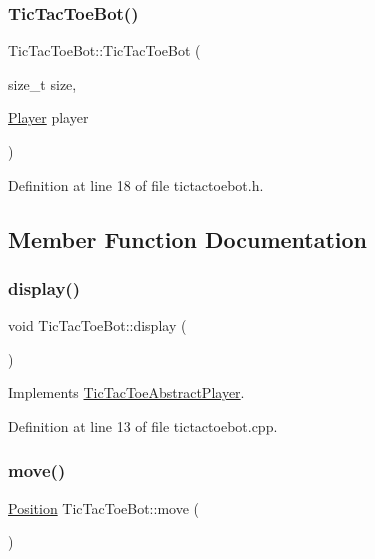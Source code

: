 \subsubsection{\texorpdfstring{Tic\+Tac\+Toe\+Bot()}{TicTacToeBot()}}
{\footnotesize\ttfamily Tic\+Tac\+Toe\+Bot\+::\+Tic\+Tac\+Toe\+Bot (\begin{DoxyParamCaption}\item[{size\+\_\+t}]{size,  }\item[{\hyperlink{common__defs_8h_a9c8780378078e51e7c9041cbac392db9}{Player}}]{player }\end{DoxyParamCaption})\hspace{0.3cm}{\ttfamily [inline]}}



Definition at line 18 of file tictactoebot.\+h.



\subsection{Member Function Documentation}
\mbox{\label{class_tic_tac_toe_bot_a2af7f24506849f05ed37e9750b515c3d}} 
\subsubsection{\texorpdfstring{display()}{display()}}
{\footnotesize\ttfamily void Tic\+Tac\+Toe\+Bot\+::display (\begin{DoxyParamCaption}{ }\end{DoxyParamCaption})\hspace{0.3cm}{\ttfamily [virtual]}}



Implements \hyperlink{class_tic_tac_toe_abstract_player_a4c36b375285f4d1511a11de121d0e5dc}{Tic\+Tac\+Toe\+Abstract\+Player}.



Definition at line 13 of file tictactoebot.\+cpp.

\mbox{\label{class_tic_tac_toe_bot_a66939785d51528036aab9cc37dd5fad5}} 
\subsubsection{\texorpdfstring{move()}{move()}}
{\footnotesize\ttfamily \hyperlink{common__defs_8h_af9623b96ea87eb8f2d0fe97e45b0f79a}{Position} Tic\+Tac\+Toe\+Bot\+::move (\begin{DoxyParamCaption}{ }\end{DoxyParamCaption})\hspace{0.3cm}{\ttfamily [virtual]}}



